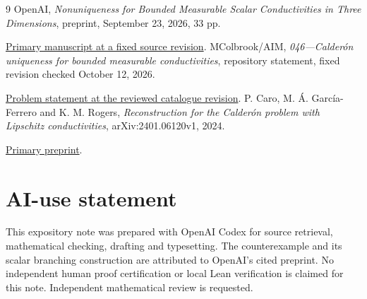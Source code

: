 \documentclass[10pt]{article}
\begin{document}
\begin{thebibliography}{9}
\small
{} OpenAI, \emph{Nonuniqueness for Bounded Measurable Scalar Conductivities in Three Dimensions}, preprint, September 23, 2026, 33 pp.\par
\href{https://github.com/openai/math/blob/fd4aeeb2ee4fc729c18d98444fed42fd0529eeeb/preprints/Nonuniqueness-for-Bounded-Measurable-Scalar-Conductivities-in-Three-Dimensions-September-23-2026/paper.pdf}{Primary manuscript at a fixed source revision}.
 MColbrook/AIM, \emph{046---Calder\'on uniqueness for bounded measurable conductivities}, repository statement, fixed revision checked October 12, 2026.\par
\href{https://github.com/MColbrook/AIM/blob/c9929805cece044705abaaebe1cebddac1ba11a6/problems/046-rough-conductivity-calderon.md}{Problem statement at the reviewed catalogue revision}.
 P. Caro, M. \'A. Garc\'ia-Ferrero and K. M. Rogers, \emph{Reconstruction for the Calder\'on problem with Lipschitz conductivities}, arXiv:2401.06120v1, 2024.\par
\href{https://arxiv.org/abs/2401.06120v1}{Primary preprint}.
\end{thebibliography}

\section*{AI-use statement}
This expository note was prepared with OpenAI Codex for source retrieval, mathematical checking, drafting and typesetting. The counterexample and its scalar branching construction are attributed to OpenAI's cited preprint. No independent human proof certification or local Lean verification is claimed for this note. Independent mathematical review is requested.
\end{document}
